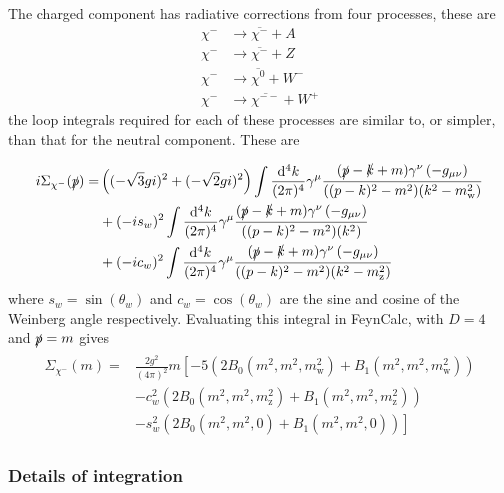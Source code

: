 \documentclass[11pt]{article}
\def\sp{\slashed{p}}
\def\cm{\chi^-}
\renewcommand{\d}{\ensuremath{\operatorname{d}\!}}
\begin{document}
The charged component has radiative corrections from four processes, these are
\begin{align*}
\chi^{-}&\rightarrow \overline{\chi^{-}}+A\\
\chi^{-}&\rightarrow \overline{\chi^{-}}+Z\\
\chi^{-}&\rightarrow \overline{\chi^{0}}+W^-\\
\chi^{-}&\rightarrow \overline{\chi^{--}}+W^+
\end{align*}
the loop integrals required for each of these processes are similar to, or simpler, than that for the neutral component.  These are

\begin{align}
\begin{split}
i\Sigma_{\cm}(\slashed{p})=&\left((-\sqrt{3}gi)^2+(-\sqrt{2}gi)^2\right) \int \frac{\d^4k}{(2\pi)^4} \gamma^{\mu}\frac{(\slashed{p}-\slashed{k}+m)\gamma^{\nu}\left(-g_{\mu\nu}\right)}{((p-k)^2-m^2)(k^2-m_{\text{w}}^2)}\\
&+(-is_w)^2 \int \frac{\d^4k}{(2\pi)^4} \gamma^{\mu}\frac{(\slashed{p}-\slashed{k}+m)\gamma^{\nu}\left(-g_{\mu\nu}\right)}{((p-k)^2-m^2)(k^2)}\\
&+(-ic_w)^2 \int \frac{\d^4k}{(2\pi)^4} \gamma^{\mu}\frac{(\slashed{p}-\slashed{k}+m)\gamma^{\nu}\left(-g_{\mu\nu}\right)}{((p-k)^2-m^2)(k^2-m_{\text{z}}^2)}
\end{split}
\end{align}
where $s_w=\sin(\theta_w)$ and $c_w=\cos(\theta_w)$ are the sine and cosine of the Weinberg angle respectively.  Evaluating this integral in FeynCalc, with $D=4$ and $\sp=m$ gives
\begin{align}
\begin{split}
\Sigma_{\cm}(m)=& \frac{2g^2}{(4\pi)^2} m \left[  -5(2B_0(m^2,m^2,m_{\text{w}}^2)+B_1(m^2,m^2,m_{\text{w}}^2)) \right.\\ & -c_w^2 (2B_0(m^2,m^2,m_{\text{z}}^2)+B_1(m^2,m^2,m_{\text{z}}^2)) \\&\left.-s_w^2(2B_0(m^2,m^2,0)+B_1(m^2,m^2,0))\right]\label{eqn:charged_SE}
\end{split}
\end{align}




\subsubsection{Details of integration}
\end{document}
